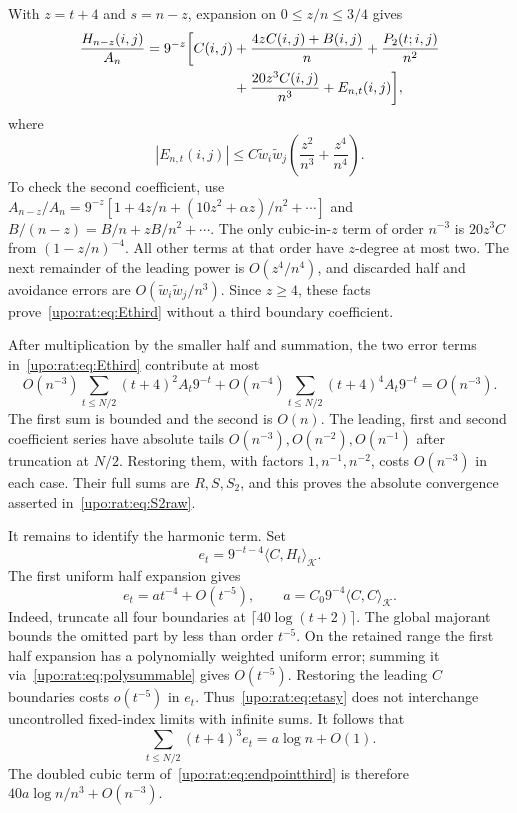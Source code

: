 \documentclass[11pt,letterpaper]{article}
\theoremstyle{remark}\newtheorem{remark}[theorem]{Remark}
\numberwithin{equation}{section}
\begin{document}
With $z=t+4$ and $s=n-z$, expansion on $0\le z/n\le3/4$ gives
\begin{align}\label{upo:rat:eq:endpointthird}
\frac{H_{n-z}(i,j)}{A_n}=9^{-z}\biggl[ C(i,j)
&+\frac{4zC(i,j)+B(i,j)}n+\frac{P_2(t;i,j)}{n^2}\notag\\
&+\frac{20z^3C(i,j)}{n^3}+E_{n,t}(i,j)\biggr],
\end{align}
where
\begin{equation}\label{upo:rat:eq:Ethird}
|E_{n,t}(i,j)|\le C\widetilde w_i\widetilde w_j
\left(\frac{z^2}{n^3}+\frac{z^4}{n^4}\right).
\end{equation}
To check the second coefficient, use
$A_{n-z}/A_n=9^{-z}[1+4z/n+(10z^2+\alpha z)/n^2+\cdots]$
and $B/(n-z)=B/n+zB/n^2+\cdots$.
The only cubic-in-$z$ term of order $n^{-3}$ is $20z^3C$ from
$(1-z/n)^{-4}$. All other terms at that order have $z$-degree at most two.
The next remainder of the leading power is $O(z^4/n^4)$, and discarded
half and avoidance errors are $O(\widetilde w_i\widetilde w_j/n^3)$.
Since $z\ge4$, these facts prove~\eqref{upo:rat:eq:Ethird} without a third
boundary coefficient.

After multiplication by the smaller half and summation, the two error
terms in~\eqref{upo:rat:eq:Ethird} contribute at most
\[
O(n^{-3})\sum_{t\le N/2}(t+4)^2A_t9^{-t}
+O(n^{-4})\sum_{t\le N/2}(t+4)^4A_t9^{-t}=O(n^{-3}).
\]
The first sum is bounded and the second is $O(n)$.
The leading, first and second coefficient series have absolute tails
$O(n^{-3}),O(n^{-2}),O(n^{-1})$ after truncation at $N/2$.
Restoring them, with factors $1,n^{-1},n^{-2}$, costs $O(n^{-3})$ in each
case. Their full sums are $R,S,S_2$, and this proves the absolute
convergence asserted in~\eqref{upo:rat:eq:S2raw}.

It remains to identify the harmonic term. Set
\[
e_t=9^{-t-4}\langle C,H_t\rangle_{\mathcal K}.
\]
The first uniform half expansion gives
\begin{equation}\label{upo:rat:eq:etasy}
e_t=a t^{-4}+O(t^{-5}),\qquad
 a=C_0 9^{-4}\langle C,C\rangle_{\mathcal K}.
\end{equation}
Indeed, truncate all four boundaries at $\lceil40\log(t+2)\rceil$.
The global majorant bounds the omitted part by less than order $t^{-5}$.
On the retained range the first half expansion has a polynomially
weighted uniform error; summing it via~\eqref{upo:rat:eq:polysummable} gives
$O(t^{-5})$. Restoring the leading $C$ boundaries costs $o(t^{-5})$ in $e_t$. Thus~\eqref{upo:rat:eq:etasy} does not interchange uncontrolled
fixed-index limits with infinite sums.
It follows that
\[
\sum_{t\le N/2}(t+4)^3e_t=a\log n+O(1).
\]
The doubled cubic term of~\eqref{upo:rat:eq:endpointthird} is therefore
$40a\log n/n^3+O(n^{-3})$.
\end{document}
